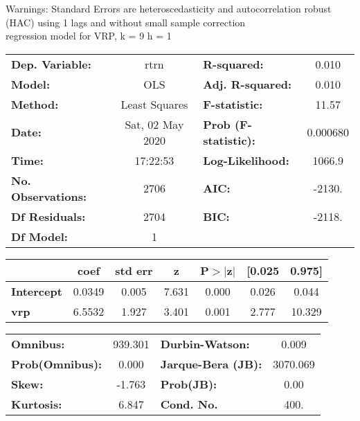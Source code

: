 Warnings: \newline
 [1] Standard Errors are heteroscedasticity and autocorrelation robust (HAC) using 1 lags and without small sample correction\\ 

regression model for VRP, k = 9 h = 1\begin{center}
\begin{tabular}{lclc}
\toprule
\textbf{Dep. Variable:}    &       rtrn       & \textbf{  R-squared:         } &     0.010   \\
\textbf{Model:}            &       OLS        & \textbf{  Adj. R-squared:    } &     0.010   \\
\textbf{Method:}           &  Least Squares   & \textbf{  F-statistic:       } &     11.57   \\
\textbf{Date:}             & Sat, 02 May 2020 & \textbf{  Prob (F-statistic):} &  0.000680   \\
\textbf{Time:}             &     17:22:53     & \textbf{  Log-Likelihood:    } &    1066.9   \\
\textbf{No. Observations:} &        2706      & \textbf{  AIC:               } &    -2130.   \\
\textbf{Df Residuals:}     &        2704      & \textbf{  BIC:               } &    -2118.   \\
\textbf{Df Model:}         &           1      & \textbf{                     } &             \\
\bottomrule
\end{tabular}
\begin{tabular}{lcccccc}
                   & \textbf{coef} & \textbf{std err} & \textbf{z} & \textbf{P$> |$z$|$} & \textbf{[0.025} & \textbf{0.975]}  \\
\midrule
\textbf{Intercept} &       0.0349  &        0.005     &     7.631  &         0.000        &        0.026    &        0.044     \\
\textbf{vrp}       &       6.5532  &        1.927     &     3.401  &         0.001        &        2.777    &       10.329     \\
\bottomrule
\end{tabular}
\begin{tabular}{lclc}
\textbf{Omnibus:}       & 939.301 & \textbf{  Durbin-Watson:     } &    0.009  \\
\textbf{Prob(Omnibus):} &   0.000 & \textbf{  Jarque-Bera (JB):  } & 3070.069  \\
\textbf{Skew:}          &  -1.763 & \textbf{  Prob(JB):          } &     0.00  \\
\textbf{Kurtosis:}      &   6.847 & \textbf{  Cond. No.          } &     400.  \\
\bottomrule
\end{tabular}
\end{center}

